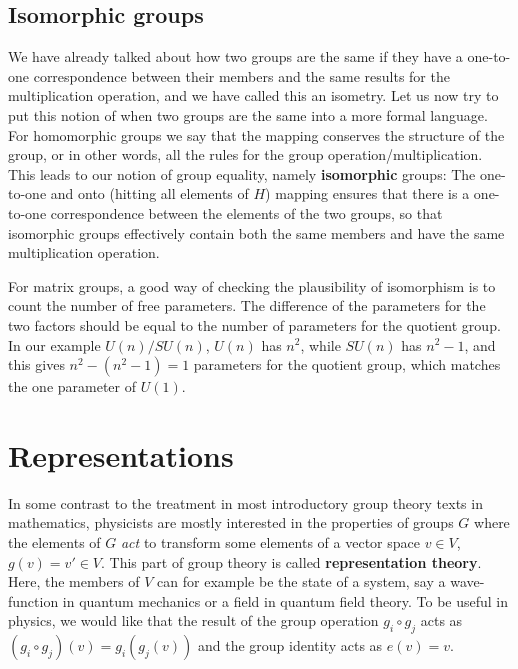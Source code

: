 \documentclass[notes.tex]{subfiles}
\begin{document}
\subsection{Isomorphic groups}
We have already talked about how two groups are the same if they have a one-to-one correspondence between their members and the same results for the multiplication operation, and we have called this an isometry. Let us now try to put this notion of when two groups are the same into a more formal language.
For homomorphic groups we say that the mapping conserves the structure of the group, or in other words, all the rules for the group operation/multiplication. This leads to our notion of group equality, namely {\bf isomorphic} groups:
The one-to-one and onto (hitting all elements of $H$) mapping ensures that there is a one-to-one correspondence between the elements of the two groups, so that isomorphic groups effectively contain both the same members and have the same multiplication operation.

For matrix groups, a good way of checking the plausibility of isomorphism is to count the number of free parameters. The difference of the parameters for the two factors should be equal to the number of parameters for the quotient group. In our example $U(n)/SU(n)$, $U(n)$ has $n^2$, while $SU(n)$ has $n^2-1$, and this gives $n^2-(n^2-1)=1$ parameters for the quotient group, which matches the one parameter of $U(1)$. 


\section{Representations}
\label{sec:rep}
In some contrast to the treatment in most introductory group theory texts in mathematics, physicists are mostly interested in the properties of groups $G$ where the elements of $G$ {\it act} to transform some elements of a vector space $v\in V$, $g(v) = v' \in V$. This part of group theory is called {\bf representation theory}. Here, the members of $V$ can for example be the state of a system, say a wave-function in quantum mechanics or a field in quantum field theory. 
To be useful in physics, we would like that the result of the group operation $g_i \circ g_j$ acts as $(g_i\circ g_j)(v) = g_i(g_j(v))$ and the group identity acts as $e(v) = v$.
\end{document}
